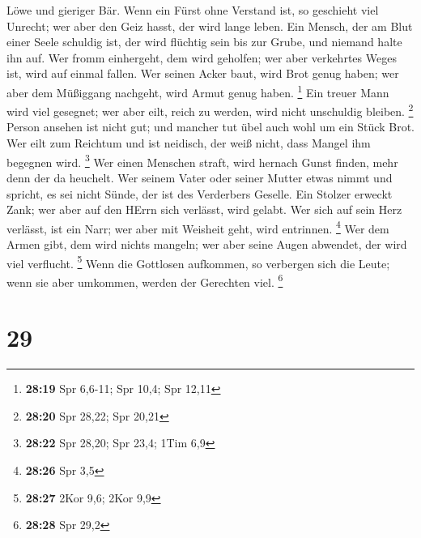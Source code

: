 Löwe und gieriger Bär.  Wenn ein Fürst ohne Verstand ist,
so geschieht viel Unrecht; wer aber den Geiz hasst, der wird lange
leben.  Ein Mensch, der am Blut einer Seele schuldig ist,
der wird flüchtig sein bis zur Grube, und niemand halte ihn auf.
 Wer fromm einhergeht, dem wird geholfen; wer aber
verkehrtes Weges ist, wird auf einmal fallen.  Wer seinen
Acker baut, wird Brot genug haben; wer aber dem Müßiggang nachgeht, wird
Armut genug haben. \footnote{\textbf{28:19} Spr 6,6-11; Spr 10,4; Spr
  12,11}  Ein treuer Mann wird viel gesegnet; wer aber
eilt, reich zu werden, wird nicht unschuldig bleiben. \footnote{\textbf{28:20}
  Spr 28,22; Spr 20,21}  Person ansehen ist nicht gut;
und mancher tut übel auch wohl um ein Stück Brot.  Wer
eilt zum Reichtum und ist neidisch, der weiß nicht, dass Mangel ihm
begegnen wird. \footnote{\textbf{28:22} Spr 28,20; Spr 23,4; 1Tim 6,9}
 Wer einen Menschen straft, wird hernach Gunst finden,
mehr denn der da heuchelt.  Wer seinem Vater oder seiner
Mutter etwas nimmt und spricht, es sei nicht Sünde, der ist des
Verderbers Geselle.  Ein Stolzer erweckt Zank; wer aber
auf den HErrn sich verlässt, wird gelabt.  Wer sich auf
sein Herz verlässt, ist ein Narr; wer aber mit Weisheit geht, wird
entrinnen. \footnote{\textbf{28:26} Spr 3,5}  Wer dem
Armen gibt, dem wird nichts mangeln; wer aber seine Augen abwendet, der
wird viel verflucht. \footnote{\textbf{28:27} 2Kor 9,6; 2Kor 9,9}
 Wenn die Gottlosen aufkommen, so verbergen sich die
Leute; wenn sie aber umkommen, werden der Gerechten viel. \footnote{\textbf{28:28}
  Spr 29,2}

\hypertarget{section-28}{%
\section{29}\label{section-28}}

